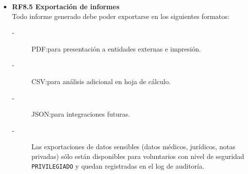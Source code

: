 \begin{itemize}
    \item \textbf{RF8.5 Exportación de informes} \\
    Todo informe generado debe poder exportarse en los siguientes formatos:
    \begin{description}
        \item[-] PDF:\@ para presentación a entidades externas e impresión.
        \item[-] CSV:\@ para análisis adicional en hoja de cálculo.
        \item[-] JSON:\@ para integraciones futuras.
        \item[-] Las exportaciones de datos sensibles (datos médicos, jurídicos,
        notas privadas) sólo están disponibles para voluntarios con nivel de
        seguridad \texttt{PRIVILEGIADO} y quedan registradas en el log de auditoría.
    \end{description}
\end{itemize}

